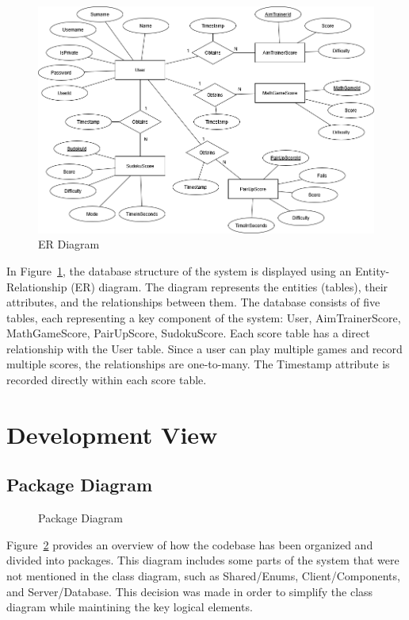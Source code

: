 \documentclass[11pt,a4paper]{article}
\newcommand{\inputdiagram}[1]{}
\newcommand{\textwidthdiagram}[2][1]{%
  \resizebox{#1\textwidth}{!}{\inputdiagram{#2}}%
}
\begin{document}
\begin{figure}[H]
    \centering
    \includegraphics[width=\textwidth]{Diagrams/out/PNG/ER_Diagram_fix.drawio.png}
    \caption{ER Diagram}
    \label{fig:ER_diagram}
\end{figure}

In Figure~\ref{fig:ER_diagram}, the database structure of the system is displayed using an Entity-Relationship (ER) diagram. The diagram represents the entities (tables), their attributes, and the relationships between them. The database consists of five tables, each representing a key component of the system: User, AimTrainerScore, MathGameScore, PairUpScore, SudokuScore. Each score table has a direct relationship with the User table. Since a user can play multiple games and record multiple scores, the relationships are one-to-many. The Timestamp attribute is recorded directly within each score table.


\section{Development View}

\subsection{Package Diagram}

\begin{figure}[H]
    \centering
    \textwidthdiagram{Package_Diagram.latex}
    \caption{Package Diagram} 
    \label{fig:united_package}
\end{figure}

Figure~\ref{fig:united_package} provides an overview of how the codebase has
been organized and divided into packages. This diagram includes some parts of
the system that were not mentioned in the class diagram, such as Shared/Enums,
Client/Components, and Server/Database. This decision was made in order to
simplify the class diagram while maintining the key logical elements.
\end{document}

